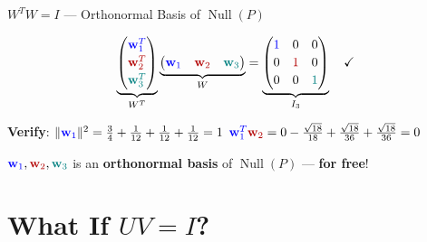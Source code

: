 \documentclass[10pt]{beamer}
\theoremstyle{definition}
\newcommand{\x}[1]{\alert{\textbf{#1}}}
\newcommand{\bl}[1]{{\color{blue}#1}}                 %
\newcommand{\rd}[1]{{\color{red!70!black}#1}}         %
\newcommand{\tl}[1]{{\color{teal}#1}}                 %
\begin{document}
\begin{frame}{$W^TW = I$ --- Orthonormal Basis of $\operatorname{Null}(P)$}

$$\underbrace{\begin{pmatrix} \bl{\mathbf{w}_1^T} \\[2pt] \rd{\mathbf{w}_2^T} \\[2pt] \tl{\mathbf{w}_3^T} \end{pmatrix}}_{W^T}
\underbrace{\begin{pmatrix} \bl{\mathbf{w}_1} & \rd{\mathbf{w}_2} & \tl{\mathbf{w}_3} \end{pmatrix}}_{W}
=
\underbrace{\begin{pmatrix} \bl{1} & 0 & 0 \\[2pt] 0 & \rd{1} & 0 \\[2pt] 0 & 0 & \tl{1} \end{pmatrix}}_{I_3} \quad\checkmark$$

\vspace{0.3em}

\x{Verify}: $\|\bl{\mathbf{w}_1}\|^2 = \frac{3}{4} + \frac{1}{12} + \frac{1}{12} + \frac{1}{12} = 1$ \;\checkmark \qquad $\bl{\mathbf{w}_1^T}\rd{\mathbf{w}_2} = 0 - \frac{\sqrt{18}}{18} + \frac{\sqrt{18}}{36} + \frac{\sqrt{18}}{36} = 0$ \;\checkmark

\vspace{0.5em}

$\bl{\mathbf{w}_1}, \rd{\mathbf{w}_2}, \tl{\mathbf{w}_3}$ is an \x{orthonormal basis} of $\operatorname{Null}(P)$ --- \x{for free}!

\end{frame}

\section{What If $UV = I$?}
\end{document}
